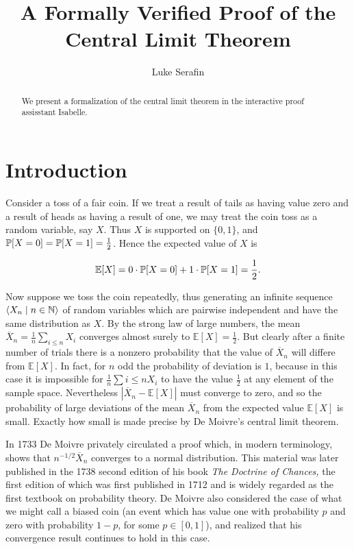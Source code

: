 \documentclass{amsart}
\title{A Formally Verified Proof of the Central Limit Theorem}
\author{Luke Serafin}
\theoremstyle{definition}
\theoremstyle{remark}
\newcommand{\bldseq}[2]{\langle{#1}\mid{#2}\rangle}
\renewcommand{\E}{\mathbb E}
\begin{document}
\begin{abstract}
We present a formalization of the central limit theorem in the interactive proof assisstant Isabelle.
\end{abstract}

\maketitle

\section{Introduction}

Consider a toss of a fair coin. If we treat a result of tails as having value zero and a result of heads as having a result of one, we may treat the coin toss as a random variable, say $X$. Thus $X$ is supported on $\{0,1\}$, and $\P[X = 0] = \P[X = 1] = \frac{1}{2}$. Hence the expected value of $X$ is

\[ \E[X] = 0 \cdot \P[X = 0] + 1 \cdot \P[X = 1] = \frac{1}{2}. \]

Now suppose we toss the coin repeatedly, thus generating an infinite sequence $\bldseq{X_n}{n \in \N}$ of random variables which are pairwise independent and have the same distribution as $X$. By the strong law of large numbers, the mean $\overline X_n = \frac{1}{n} \sum_{i \le n} X_i$ converges almost surely to $\E[X] = \frac{1}{2}$. But clearly after a finite number of trials there is a nonzero probability that the value of $\overline X_n$ will differe from $\E[X]$. In fact, for $n$ odd the probability of deviation is $1$, because in this case it is impossible for $\frac{1}{n} \sum{i \le n} X_i$ to have the value $\frac{1}{2}$ at any element of the sample space. Nevertheless $|\overline X_n - \E[X]|$ must converge to zero, and so the probability of large deviations of the mean $\overline X_n$ from the expected value $\E[X]$ is small. Exactly how small is made precise by De Moivre's central limit theorem.

In 1733 De Moivre privately circulated a proof which, in modern terminology, shows that $n^{-1/2} \overline X_n$ converges to a normal distribution. This material was later published in the 1738 second edition of his book {\em The Doctrine of Chances,} the first edition of which was first published in 1712 and is widely regarded as the first textbook on probability theory. De Moivre also considered the case of what we might call a biased coin (an event which has value one with probability $p$ and zero with probability $1-p$, for some $p \in [0,1]$), and realized that his convergence result continues to hold in this case.
\end{document}

